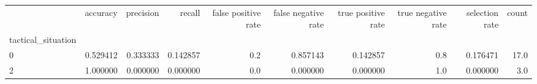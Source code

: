 \begin{tabular}{lrrrrrrrrr}
\toprule
{} &  accuracy &  precision &    recall &  false positive rate &  false negative rate &  true positive rate &  true negative rate &  selection rate &  count \\
tactical\_situation &           &            &           &                      &                      &                     &                     &                 &        \\
\midrule
0                  &  0.529412 &   0.333333 &  0.142857 &                  0.2 &             0.857143 &            0.142857 &                 0.8 &        0.176471 &   17.0 \\
2                  &  1.000000 &   0.000000 &  0.000000 &                  0.0 &             0.000000 &            0.000000 &                 1.0 &        0.000000 &    3.0 \\
\bottomrule
\end{tabular}
